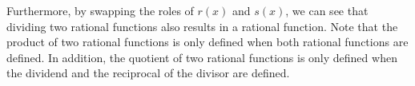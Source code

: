 \documentclass{ximera}
\begin{document}
Furthermore, by swapping the roles of $r(x)$ and $s(x)$, we can see that dividing two rational functions also results in a rational function. Note that the product of two rational functions is only defined when both rational functions are defined. In addition, the quotient of two rational functions is only defined when the dividend and the reciprocal of the divisor are defined. 
%
%
%
%
%
%
\end{document}
